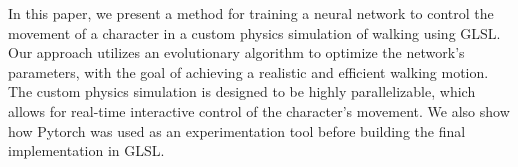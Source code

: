     In this paper, we present a method for training a neural network to control the movement of a character in a custom physics simulation of walking using GLSL. Our approach utilizes an evolutionary algorithm to optimize the network's parameters, with the goal of achieving a realistic and efficient walking motion. The custom physics simulation is designed to be highly parallelizable, which allows for real-time interactive control of the character's movement. We also show how Pytorch was used as an experimentation tool before building the final implementation in GLSL.